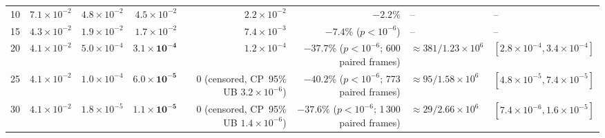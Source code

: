 \begin{table}[t]
{\begin{tabular}{rrrrrrll}
\midrule
10  & $7.1 \times 10^{-2}$  & $4.8 \times 10^{-2}$ & $4.5 \times 10^{-2}$ & $2.2 \times 10^{-2}$  & $-2.2\%$ & -- & -- \\
15  & $4.3 \times 10^{-2}$  & $1.9 \times 10^{-2}$ & $1.7 \times 10^{-2}$ & $7.4 \times 10^{-3}$  & $-7.4\%$ ($p < 10^{-6}$) & -- & -- \\
20  & $4.1 \times 10^{-2}$  & $5.0 \times 10^{-4}$ & $\mathbf{3.1 \times 10^{-4}}$ & $1.2 \times 10^{-4}$ & $\mathbf{-37.7\%}$ ($p < 10^{-6}$; 600 paired frames) & $\approx 381 / 1.23 \times 10^{6}$  & $[2.8\times10^{-4}, 3.4\times10^{-4}]$ \\
25  & $4.1 \times 10^{-2}$  & $1.0 \times 10^{-4}$ & $\mathbf{6.0 \times 10^{-5}}$ & $0$ (censored, CP~95\% UB $3.2 \times 10^{-6}$) & $\mathbf{-40.2\%}$ ($p < 10^{-6}$; 773 paired frames) & $\approx 95 / 1.58 \times 10^{6}$  & $[4.8\times10^{-5}, 7.4\times10^{-5}]$ \\
30  & $4.1 \times 10^{-2}$  & $1.8 \times 10^{-5}$ & $\mathbf{1.1 \times 10^{-5}}$ & $0$ (censored, CP~95\% UB $1.4 \times 10^{-6}$) & $\mathbf{-37.6\%}$ ($p < 10^{-6}$; 1\,300 paired frames) & $\approx 29 / 2.66 \times 10^{6}$  & $[7.4\times10^{-6}, 1.6\times10^{-5}]$ \\
\bottomrule
\end{tabular}
}
\end{table}


